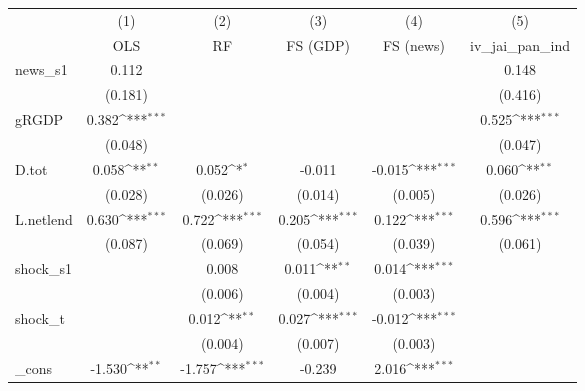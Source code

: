 {
\def\sym#1{\ifmmode^{#1}\else\(^{#1}\)\fi}
\begin{tabular}{l*{5}{c}}
\toprule
            &\multicolumn{1}{c}{(1)}&\multicolumn{1}{c}{(2)}&\multicolumn{1}{c}{(3)}&\multicolumn{1}{c}{(4)}&\multicolumn{1}{c}{(5)}\\
            &\multicolumn{1}{c}{OLS}&\multicolumn{1}{c}{RF}&\multicolumn{1}{c}{FS (GDP)}&\multicolumn{1}{c}{FS (news)}&\multicolumn{1}{c}{iv\_jai\_pan\_ind}\\
\midrule
news\_s1     &       0.112         &                     &                     &                     &       0.148         \\
            &     (0.181)         &                     &                     &                     &     (0.416)         \\
\addlinespace
gRGDP       &       0.382\sym{***}&                     &                     &                     &       0.525\sym{***}\\
            &     (0.048)         &                     &                     &                     &     (0.047)         \\
\addlinespace
D.tot       &       0.058\sym{**} &       0.052\sym{*}  &      -0.011         &      -0.015\sym{***}&       0.060\sym{**} \\
            &     (0.028)         &     (0.026)         &     (0.014)         &     (0.005)         &     (0.026)         \\
\addlinespace
L.netlend   &       0.630\sym{***}&       0.722\sym{***}&       0.205\sym{***}&       0.122\sym{***}&       0.596\sym{***}\\
            &     (0.087)         &     (0.069)         &     (0.054)         &     (0.039)         &     (0.061)         \\
\addlinespace
shock\_s1    &                     &       0.008         &       0.011\sym{**} &       0.014\sym{***}&                     \\
            &                     &     (0.006)         &     (0.004)         &     (0.003)         &                     \\
\addlinespace
shock\_t     &                     &       0.012\sym{**} &       0.027\sym{***}&      -0.012\sym{***}&                     \\
            &                     &     (0.004)         &     (0.007)         &     (0.003)         &                     \\
\addlinespace
\_cons      &      -1.530\sym{**} &      -1.757\sym{***}&      -0.239         &       2.016\sym{***}&                     \\

\end{tabular}}
